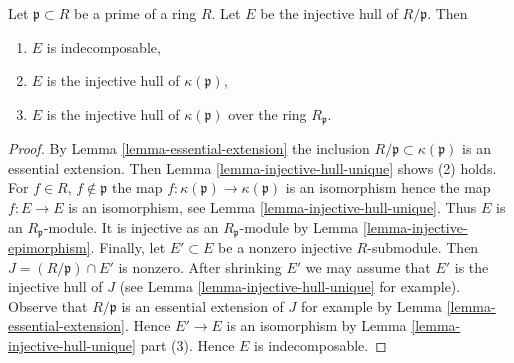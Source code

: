\begin{lemma}
\label{lemma-injective-hull-indecomposable}
Let $\mathfrak p \subset R$ be a prime of a ring $R$.
Let $E$ be the injective hull of $R/\mathfrak p$. Then
\begin{enumerate}
\item $E$ is indecomposable,
\item $E$ is the injective hull of $\kappa(\mathfrak p)$,
\item $E$ is the injective hull of $\kappa(\mathfrak p)$
over the ring $R_\mathfrak p$.
\end{enumerate}
\end{lemma}

\begin{proof}
By Lemma \ref{lemma-essential-extension} the inclusion
$R/\mathfrak p \subset \kappa(\mathfrak p)$ is an essential
extension. Then Lemma \ref{lemma-injective-hull-unique}
shows (2) holds. For $f \in R$, $f \not \in \mathfrak p$
the map $f : \kappa(\mathfrak p) \to \kappa(\mathfrak p)$ is an isomorphism
hence the map $f : E \to E$ is an isomorphism,
see Lemma \ref{lemma-injective-hull-unique}.
Thus $E$ is an $R_\mathfrak p$-module. It is injective
as an $R_\mathfrak p$-module by Lemma \ref{lemma-injective-epimorphism}.
Finally, let $E' \subset E$ be a nonzero injective $R$-submodule.
Then $J = (R/\mathfrak p) \cap E'$ is nonzero. After shrinking $E'$
we may assume that $E'$ is the injective hull of $J$ (see
Lemma \ref{lemma-injective-hull-unique} for example).
Observe that $R/\mathfrak p$ is an essential extension of $J$ for example by
Lemma \ref{lemma-essential-extension}. Hence $E' \to E$
is an isomorphism by Lemma \ref{lemma-injective-hull-unique} part (3).
Hence $E$ is indecomposable.
\end{proof}

